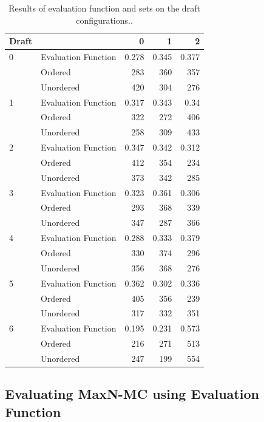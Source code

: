 \documentclass[letterpaper]{article}
\numberwithin{equation}{section}
\numberwithin{theorem}{section}
\numberwithin{lemma}{section}
\numberwithin{df}{section}
\begin{document}
\begin{table}[]
\begin{tabular}{l l r r r}  %
\hline                       %
Draft &  & 0 & 1 & 2 \\[0.5ex]%
\hline                    %
0&Evaluation Function&0.278&0.345&0.377\\
&Ordered&283&360&357\\
&Unordered&420&304&276\\
1&Evaluation Function&0.317&0.343&0.34\\
&Ordered&322&272&406\\
&Unordered&258&309&433\\
2&Evaluation Function&0.347&0.342&0.312\\
&Ordered&412&354&234\\
&Unordered&373&342&285\\
3&Evaluation Function&0.323&0.361&0.306\\
&Ordered&293&368&339\\
&Unordered&347&287&366\\
4&Evaluation Function&0.288&0.333&0.379\\
&Ordered&330&374&296\\
&Unordered&356&368&276\\
5&Evaluation Function&0.362&0.302&0.336\\
&Ordered&405&356&239\\
&Unordered&317&332&351\\
6&Evaluation Function&0.195&0.231&0.573\\
&Ordered&216&271&513\\
&Unordered&247&199&554\\
[1ex]
\hline     %
\end{tabular} 
\caption{\label{tab:results} Results of evaluation function and sets on the draft configurations..}
\end{table}


\subsection{Evaluating MaxN-MC using Evaluation Function}
\end{document}
